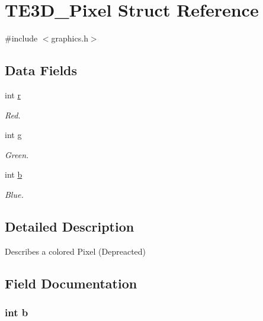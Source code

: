 \hypertarget{struct_t_e3_d___pixel}{\section{T\-E3\-D\-\_\-\-Pixel Struct Reference}
\label{struct_t_e3_d___pixel}
}


{\ttfamily \#include $<$graphics.\-h$>$}

\subsection*{Data Fields}
\begin{DoxyCompactItemize}
\item 
int \hyperlink{struct_t_e3_d___pixel_acab531abaa74a7e664e3986f2522b33a}{r}
\begin{DoxyCompactList}\small\item\em Red. \end{DoxyCompactList}\item 
int \hyperlink{struct_t_e3_d___pixel_a71867e609034d4dbd6d0ad8d84540e59}{g}
\begin{DoxyCompactList}\small\item\em Green. \end{DoxyCompactList}\item 
int \hyperlink{struct_t_e3_d___pixel_a148e3876077787926724625411d6e7a9}{b}
\begin{DoxyCompactList}\small\item\em Blue. \end{DoxyCompactList}\end{DoxyCompactItemize}


\subsection{Detailed Description}
Describes a colored Pixel (Depreacted) 

\subsection{Field Documentation}
\hypertarget{struct_t_e3_d___pixel_a148e3876077787926724625411d6e7a9}{
\subsubsection[{b}]{\setlength{\rightskip}{0pt plus 5cm}int b}}\label{struct_t_e3_d___pixel_a148e3876077787926724625411d6e7a9}


